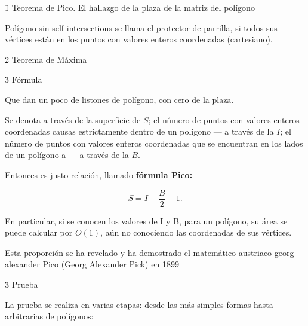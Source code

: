 \h1{ Teorema de Pico. El hallazgo de la plaza de la matriz del polígono }

Polígono sin self-intersections se llama el protector de parrilla, si todos sus vértices están en los puntos con valores enteros coordenadas (cartesiano).


\h2{ Teorema de Máxima }


\h3{ Fórmula }

Que dan un poco de listones de polígono, con cero de la plaza.

Se denota a través de la superficie de $S$; el número de puntos con valores enteros coordenadas causas estrictamente dentro de un polígono --- a través de la $I$; el número de puntos con valores enteros coordenadas que se encuentran en los lados de un polígono a --- a través de la $B$.

Entonces es justo relación, llamado \bf{fórmula Pico}:

$$ S = I + \frac{B}{2} - 1. $$

En particular, si se conocen los valores de I y B, para un polígono, su área se puede calcular por $O (1)$, aún no conociendo las coordenadas de sus vértices.

Esta proporción se ha revelado y ha demostrado el matemático austriaco georg alexander Pico (Georg Alexander Pick) en 1899


\h3{ Prueba }

La prueba se realiza en varias etapas: desde las más simples formas hasta arbitrarias de polígonos:

